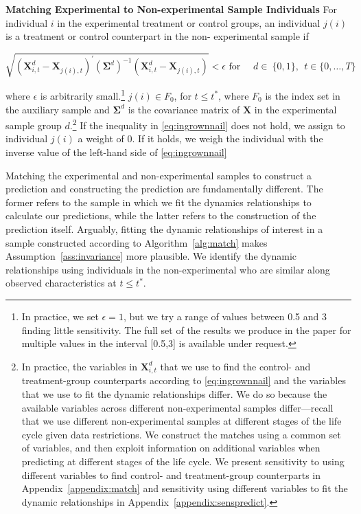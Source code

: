 \onehalfspacing
\begin{algorithm} \textbf{Matching Experimental to Non-experimental Sample Individuals} \label{alg:match}
For individual $i$ in the experimental treatment or control groups, an individual $j(i)$ is a treatment or control counterpart in the non- experimental sample if

\begin{equation}\label{eq:ingrownnail}
\sqrt{\left( \bm{X}^{d}_{i,t} - \bm{X}_{j(i),t} \right)^{\prime} {\left( \bm{\Sigma}^d\right)}^{-1} \left(\bm{X}^{d}_{i,t} - \bm{X}_{j(i),t} \right)} < \epsilon \text{ for } \quad d \in \ \{0,1\}, \ \ t \in \{0,\dots,T\}
\end{equation}

\noindent where $\epsilon$ is arbitrarily small.\footnote{In practice, we set $\epsilon = 1$, but we try a range of values between 0.5 and 3 finding little sensitivity. The full set of the results we produce in the paper for multiple values in the interval [0.5,3] is available under request.} $j(i) \in F_0$, for $t \leq t^{\ast}$, where $F_0$ is the index set in the auxiliary sample and $\bm{\Sigma}^d$ is the covariance matrix of $\bm{X}$ in the experimental sample group $d$.\footnote{In practice, the variables in $\bm{X}^{d}_{i,t}$ that we use to find the control- and treatment-group counterparts according to \eqref{eq:ingrownnail} and the variables that we use to fit the dynamic relationships differ. We do so because the available variables across different non-experimental samples differ---recall that we use different non-experimental samples at different stages of the life cycle given data restrictions. We construct the matches using a common set of variables, and then exploit information on additional variables when predicting at different stages of the life cycle. We present sensitivity to using different variables to find control- and treatment-group counterparts in Appendix~\ref{appendix:match} and sensitivity using different variables to fit the dynamic relationships in Appendix~\ref{appendix:senspredict}.} If the inequality in \eqref{eq:ingrownnail} does not hold, we assign to individual $j(i)$ a weight of 0. If it holds, we weigh the individual with the inverse value of the left-hand side of \eqref{eq:ingrownnail} \\
\end{algorithm}
\doublespacing

\noindent Matching the experimental and non-experimental samples to construct a prediction and constructing the prediction are fundamentally different. The former refers to the sample in which we fit the dynamics relationships to calculate our predictions, while the latter refers to the construction of the prediction itself. Arguably, fitting the dynamic relationships of interest in a sample constructed according to Algorithm~\ref{alg:match} makes Assumption~\ref{ass:invariance} more plausible. We identify the dynamic relationships using individuals in the non-experimental who are similar along observed characteristics at $t \leq t^*$.\\

